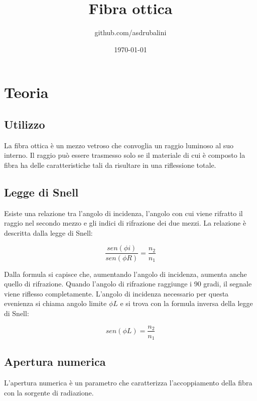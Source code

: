 \documentclass{article}
\title{Fibra ottica}
\author{github.com/asdrubalini}
\date{\today}
\begin{document}
    \maketitle

    \section{Teoria}

    \subsection{Utilizzo}

    La fibra ottica è un mezzo vetroso che convoglia un raggio luminoso al suo interno. 
    Il raggio può essere trasmesso solo se il materiale di cui è composto la fibra ha delle caratteristiche
    tali da risultare in una riflessione totale.

    \subsection{Legge di Snell}

    Esiste una relazione tra l'angolo di incidenza, l'angolo con cui viene rifratto il raggio nel secondo mezzo e gli indici di
    rifrazione dei due mezzi. La relazione è descritta dalla legge di Snell:

    \begin{equation}
        \frac{sen (\phi i)}{sen (\phi R)} = \frac{n_2}{n_1}
    \end{equation}

    Dalla formula si capisce che, aumentando l'angolo di incidenza, aumenta anche quello di rifrazione. Quando l'angolo di rifrazione
    raggiunge i 90 gradi, il segnale viene riflesso completamente. L'angolo di incidenza necessario per questa evenienza si chiama
    angolo limite $\phi L$ e si trova con la formula inversa della legge di Snell:

    \begin{equation}
        sen (\phi L) = \frac{n_2}{n_1}
    \end{equation}

    \subsection{Apertura numerica}

    L'apertura numerica è un parametro che caratterizza l'accoppiamento della fibra con la sorgente di radiazione.
\end{document}
